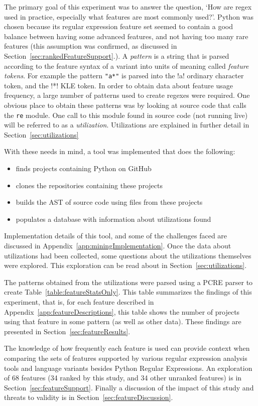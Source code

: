 \label{sec:featureOverview}
The primary goal of this experiment was to answer the question, `How are regex used in practice, especially what features are most commonly used?'.  Python was chosen because its regular expression feature set seemed to contain a good balance between having some advanced features, and not having too many rare features (this assumption was confirmed, as discussed in Section~\ref{sec:rankedFeatureSupport}.).  A \emph{pattern} is a string that is parsed according to the feature syntax of a variant into units of meaning called \emph{feature tokens}.  For example the pattern \verb!"a*"! is parsed into the \bverb!a! ordinary character token, and the \bverb!*! KLE token.
In order to obtain data about feature usage frequency, a large number of patterns used to create regexes were required.  One obvious place to obtain these patterns was by looking at source code that calls the {\tt re} module.  One call to this module found in source code (not running live) will be referred to as a \emph{utilization}.  Utilizations are explained in further detail in Section~\ref{sec:utilizations}

With these needs in mind, a tool was implemented that does the following:
\begin{itemize} \itemsep -1pt
\item finds projects containing Python on GitHub
\item clones the repositories containing these projects
\item builds the AST of source code using files from these projects
\item populates a database with information about utilizations found
\end{itemize}

Implementation details of this tool, and some of the challenges faced are discussed in Appendix~\ref{app:miningImplementation}.  Once the data about utilizations had been collected, some questions about the utilizations themselves were explored.  This exploration can be read about in Section~\ref{sec:utilizations}.

The patterns obtained from the utilizations were parsed using a PCRE parser to create Table~\ref{table:featureStatsOnly}.  This table summarizes the findings of this experiment, that is, for each feature described in Appendix~\ref{app:featureDescriptions}, this table shows the number of projects using that feature in some pattern (as well as other data).  These findings are presented in Section~\ref{sec:featureResults}.

The knowledge of how frequently each feature is used can provide context when comparing the sets of features supported by various regular expression analysis tools and language variants besides Python Regular Expressions.  An exploration of 68 features (34 ranked by this study, and 34 other unranked features) is in Section~\ref{sec:featureSupport}.  Finally a discussion of the impact of this study and threats to validity is in Section~\ref{sec:featureDiscussion}.
